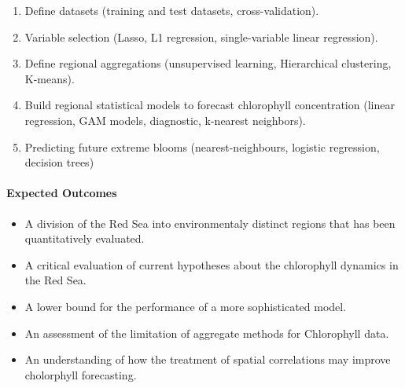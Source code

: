 \begin{enumerate}

\item Define datasets (training and test datasets, cross-validation).

\item Variable selection (Lasso, L1 regression, single-variable linear
regression).

\item Define regional aggregations (unsupervised learning, Hierarchical
clustering, K-means).

\item Build regional statistical models to forecast chlorophyll concentration
(linear regression, GAM models, diagnostic, k-nearest neighbors).

\item Predicting future extreme blooms (nearest-neighbours, logistic
regression, decision trees)

\end{enumerate}

\paragraph{Expected Outcomes}

\begin{itemize}

\item A division of the Red Sea into environmentaly distinct regions that has
been quantitatively evaluated.

\item A critical evaluation of current hypotheses about the chlorophyll
dynamics in the Red Sea.

\item A lower bound for the performance of a more sophisticated model.

\item An assessment of the limitation of aggregate methods for Chlorophyll
data.

\item An understanding of how the treatment of spatial correlations may improve
cholorphyll forecasting.

\end{itemize}
